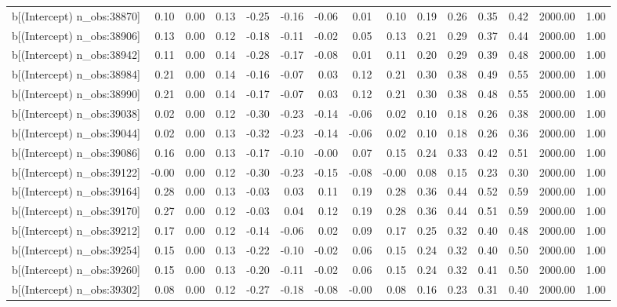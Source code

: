 \begin{table}[ht]
\begin{tabular}{rrrrrrrrrrrrrrr}
  b[(Intercept) n\_obs:38870] & 0.10 & 0.00 & 0.13 & -0.25 & -0.16 & -0.06 & 0.01 & 0.10 & 0.19 & 0.26 & 0.35 & 0.42 & 2000.00 & 1.00 \\ 
  b[(Intercept) n\_obs:38906] & 0.13 & 0.00 & 0.12 & -0.18 & -0.11 & -0.02 & 0.05 & 0.13 & 0.21 & 0.29 & 0.37 & 0.44 & 2000.00 & 1.00 \\ 
  b[(Intercept) n\_obs:38942] & 0.11 & 0.00 & 0.14 & -0.28 & -0.17 & -0.08 & 0.01 & 0.11 & 0.20 & 0.29 & 0.39 & 0.48 & 2000.00 & 1.00 \\ 
  b[(Intercept) n\_obs:38984] & 0.21 & 0.00 & 0.14 & -0.16 & -0.07 & 0.03 & 0.12 & 0.21 & 0.30 & 0.38 & 0.49 & 0.55 & 2000.00 & 1.00 \\ 
  b[(Intercept) n\_obs:38990] & 0.21 & 0.00 & 0.14 & -0.17 & -0.07 & 0.03 & 0.12 & 0.21 & 0.30 & 0.38 & 0.48 & 0.55 & 2000.00 & 1.00 \\ 
  b[(Intercept) n\_obs:39038] & 0.02 & 0.00 & 0.12 & -0.30 & -0.23 & -0.14 & -0.06 & 0.02 & 0.10 & 0.18 & 0.26 & 0.38 & 2000.00 & 1.00 \\ 
  b[(Intercept) n\_obs:39044] & 0.02 & 0.00 & 0.13 & -0.32 & -0.23 & -0.14 & -0.06 & 0.02 & 0.10 & 0.18 & 0.26 & 0.36 & 2000.00 & 1.00 \\ 
  b[(Intercept) n\_obs:39086] & 0.16 & 0.00 & 0.13 & -0.17 & -0.10 & -0.00 & 0.07 & 0.15 & 0.24 & 0.33 & 0.42 & 0.51 & 2000.00 & 1.00 \\ 
  b[(Intercept) n\_obs:39122] & -0.00 & 0.00 & 0.12 & -0.30 & -0.23 & -0.15 & -0.08 & -0.00 & 0.08 & 0.15 & 0.23 & 0.30 & 2000.00 & 1.00 \\ 
  b[(Intercept) n\_obs:39164] & 0.28 & 0.00 & 0.13 & -0.03 & 0.03 & 0.11 & 0.19 & 0.28 & 0.36 & 0.44 & 0.52 & 0.59 & 2000.00 & 1.00 \\ 
  b[(Intercept) n\_obs:39170] & 0.27 & 0.00 & 0.12 & -0.03 & 0.04 & 0.12 & 0.19 & 0.28 & 0.36 & 0.44 & 0.51 & 0.59 & 2000.00 & 1.00 \\ 
  b[(Intercept) n\_obs:39212] & 0.17 & 0.00 & 0.12 & -0.14 & -0.06 & 0.02 & 0.09 & 0.17 & 0.25 & 0.32 & 0.40 & 0.48 & 2000.00 & 1.00 \\ 
  b[(Intercept) n\_obs:39254] & 0.15 & 0.00 & 0.13 & -0.22 & -0.10 & -0.02 & 0.06 & 0.15 & 0.24 & 0.32 & 0.40 & 0.50 & 2000.00 & 1.00 \\ 
  b[(Intercept) n\_obs:39260] & 0.15 & 0.00 & 0.13 & -0.20 & -0.11 & -0.02 & 0.06 & 0.15 & 0.24 & 0.32 & 0.41 & 0.50 & 2000.00 & 1.00 \\ 
  b[(Intercept) n\_obs:39302] & 0.08 & 0.00 & 0.12 & -0.27 & -0.18 & -0.08 & -0.00 & 0.08 & 0.16 & 0.23 & 0.31 & 0.40 & 2000.00 & 1.00 \\ 

\end{tabular}
\end{table}

